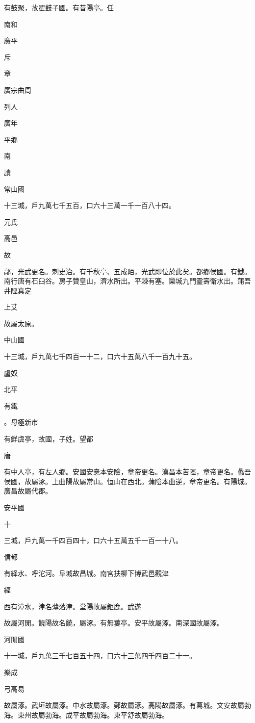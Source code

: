 \begin{pinyinscope}
有鼓聚，故翟鼓子國。有昔陽亭。任

南和

廣平

斥

章

廣宗曲周

列人

廣年

平鄉

南

讀

常山國

十三城，戶九萬七千五百，口六十三萬一千一百八十四。

元氏

高邑

故

鄗，光武更名。刺史治。有千秋亭、五成陌，光武即位於此矣。都鄉侯國。有鐵。南行唐有石臼谷。房子贊皇山，濟水所出。平棘有塞。欒城九門靈壽衛水出。蒲吾井陘真定

上艾

故屬太原。

中山國

十三城，戶九萬七千四百一十二，口六十五萬八千一百九十五。

盧奴

北平

有鐵

。母極新市

有鮮虞亭，故國，子姓。望都

唐

有中人亭，有左人鄉。安國安憙本安險，章帝更名。漢昌本苦陘，章帝更名。蠡吾侯國，故屬涿。上曲陽故屬常山。恒山在西北。蒲陰本曲逆，章帝更名。有陽城。廣昌故屬代郡。

安平國

十

三城，戶九萬一千四百四十，口六十五萬五千一百一十八。

信都

有絳水、呼沱河。阜城故昌城。南宮扶柳下博武邑觀津

經

西有漳水，津名薄落津。堂陽故屬鉅鹿。武遂

故屬河閒。饒陽故名饒，屬涿。有無蔞亭。安平故屬涿。南深國故屬涿。

河閒國

十一城，戶九萬三千七百五十四，口六十三萬四千四百二十一。

樂成

弓高易

故屬涿。武垣故屬涿。中水故屬涿。鄚故屬涿。高陽故屬涿。有葛城。文安故屬勃海。束州故屬勃海。成平故屬勃海。東平舒故屬勃海。


\end{pinyinscope}
